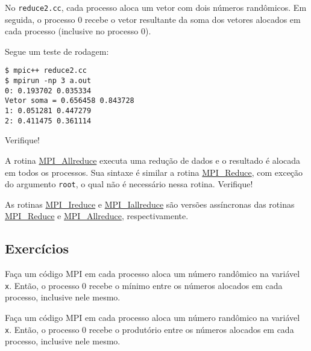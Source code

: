 \begin{ex}
  No \verb+reduce2.cc+, cada processo aloca um vetor com dois números randômicos. Em seguida, o processo $0$ recebe o vetor resultante da soma dos vetores alocados em cada processo (inclusive no processo 0).

  

  Segue um teste de rodagem:
\begin{verbatim}
$ mpic++ reduce2.cc
$ mpirun -np 3 a.out 
0: 0.193702 0.035334
Vetor soma = 0.656458 0.843728
1: 0.051281 0.447279
2: 0.411475 0.361114
\end{verbatim}
  Verifique!
\end{ex}

\begin{obs}
  A rotina \href{https://www.open-mpi.org/doc/current/man3/MPI\_Allreduce.3.php}{MPI\_Allreduce} executa uma redução de dados e o resultado é alocada em todos os processos. Sua sintaxe é similar a rotina \href{https://www.open-mpi.org/doc/current/man3/MPI_Reduce.3.php}{MPI\_Reduce}, com exceção do argumento \verb+root+, o qual não é necessário nessa rotina. Verifique!
\end{obs}

\begin{obs}
  As rotinas \href{https://www.open-mpi.org/doc/current/man3/MPI\_Ireduce.3.php}{MPI\_Ireduce} e \href{https://www.open-mpi.org/doc/current/man3/MPI\_Iallreduce.3.php}{MPI\_Iallreduce} são versões assíncronas das rotinas \href{https://www.open-mpi.org/doc/current/man3/MPI_Reduce.3.php}{MPI\_Reduce} e \href{https://www.open-mpi.org/doc/current/man3/MPI\_Allreduce.3.php}{MPI\_Allreduce}, respectivamente.
\end{obs}

\subsection* {Exercícios}

\begin{exer}
  Faça um código MPI em cada processo aloca um número randômico na variável \verb+x+. Então, o processo 0 recebe o mínimo entre os números alocados em cada processo, inclusive nele mesmo.
\end{exer}

\begin{exer}
  Faça um código MPI em cada processo aloca um número randômico na variável \verb+x+. Então, o processo 0 recebe o produtório entre os números alocados em cada processo, inclusive nele mesmo.
\end{exer}

